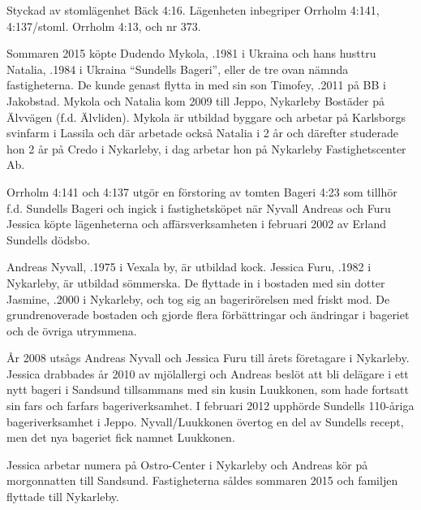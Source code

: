 
Styckad av stomlägenhet Bäck 4:16. Lägenheten inbegriper Orrholm 4:141, 4:137/stoml. Orrholm 4:13, och nr 373.


Sommaren 2015 köpte Dudendo Mykola, .1981 i Ukraina och hans husttru Natalia, .1984 i Ukraina ``Sundells Bageri'', eller de tre ovan nämnda fastigheterna. De kunde genast flytta in med sin son Timofey, .2011 på BB i Jakobstad. Mykola och Natalia kom 2009 till Jeppo, Nykarleby Bostäder på Älvvägen (f.d. Älvliden). Mykola är utbildad byggare och arbetar på Karlsborgs svinfarm i Lassila och där arbetade också Natalia i 2 år och därefter studerade hon 2 år på Credo i Nykarleby, i dag arbetar hon på Nykarleby Fastighetscenter Ab.


Orrholm  4:141 och 4:137 utgör en förstoring av tomten Bageri 4:23 som tillhör f.d. Sundells Bageri och ingick i fastighetsköpet när Nyvall Andreas och Furu Jessica köpte lägenheterna och affärsverksamheten i februari 2002 av Erland Sundells dödsbo.

Andreas Nyvall, .1975 i Vexala by, är utbildad kock. Jessica Furu, .1982 i Nykarleby, är utbildad sömmerska. De flyttade in i bostaden med sin dotter Jasmine, .2000 i Nykarleby, och tog sig an bagerirörelsen med friskt mod. De grundrenoverade bostaden och gjorde flera förbättringar och ändringar i bageriet och de övriga utrymmena.


År 2008 utsågs Andreas Nyvall och Jessica Furu till årets företagare i Nykarleby. Jessica drabbades år 2010 av mjölallergi och Andreas beslöt att bli delägare i ett nytt bageri i Sandsund tillsammans med sin kusin Luukkonen, som hade fortsatt sin fars och farfars bageriverksamhet. I februari 2012 upphörde Sundells 110-åriga bageriverksamhet i Jeppo. Nyvall/Luukkonen övertog en del av Sundells recept, men det nya bageriet fick namnet Luukkonen.
\begin{jhchildren}
  \item {}
  \item {}
  \item {}
\end{jhchildren}
Jessica arbetar numera på Ostro-Center i Nykarleby och Andreas kör på morgonnatten till Sandsund. Fastigheterna såldes sommaren 2015 och familjen flyttade till Nykarleby.


